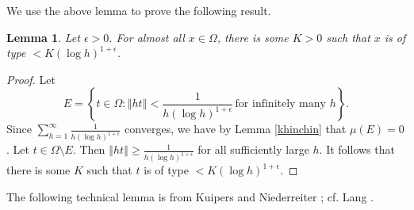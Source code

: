 \documentclass{article}
\newcommand{\norm}[1]{\left\Vert #1 \right\Vert}
\newtheorem{lemma}[theorem]{Lemma}
\begin{document}
We use the above lemma to prove the following result.

\begin{lemma}
Let $\epsilon>0$. For almost all $x \in \Omega$, there is some $K>0$ such that $x$ is of type $<K(\log h)^{1+\epsilon}$.
\label{aatype}
\end{lemma}
\begin{proof}
Let
\[
E =\left\{t \in \Omega: \norm{ht} < \frac{1}{h(\log h)^{1+\epsilon}} \, \textrm{for infinitely many $h$}\right\}.
\]
Since $\sum_{h=1}^\infty \frac{1}{h(\log h)^{1+\epsilon}}$ converges, we have by Lemma \ref{khinchin} that
$\mu(E)=0$. 
Let $t \in \Omega \setminus E$.  Then $\norm{ht} \geq \frac{1}{h (\log h)^{1+\epsilon}}$ for all sufficiently large $h$.
It follows that there is some $K$ such that $t$ is of type $<K(\log h)^{1+\epsilon}$.
\end{proof}



The following technical lemma is from Kuipers and Niederreiter \cite[p.~130, Exercise 3.9]{kuipers}; cf. Lang \cite[p.~39, Lemma]{MR0209227}.
\end{document}
